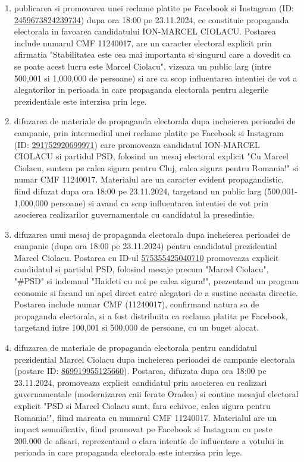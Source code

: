 \documentclass[a4paper,12pt]{article}
\begin{document}
\begin{enumerate}[leftmargin=*, label=\arabic*.)]
    \item publicarea si promovarea unei reclame platite pe Facebook si Instagram (ID: \href{https://www.facebook.com/ads/library/?id=2459673824239734}{2459673824239734}) dupa ora 18:00 pe 23.11.2024, ce constituie propaganda electorala in favoarea candidatului ION-MARCEL CIOLACU. Postarea include numarul CMF 11240017, are un caracter electoral explicit prin afirmatia "Stabilitatea este cea mai importanta si singurul care a dovedit ca se poate acest lucru este Marcel Ciolacu", vizeaza un public larg (intre 500,001 si 1,000,000 de persoane) si are ca scop influentarea intentiei de vot a alegatorilor in perioada in care propaganda electorala pentru alegerile prezidentiale este interzisa prin lege.
    \item difuzarea de materiale de propaganda electorala dupa incheierea perioadei de campanie, prin intermediul unei reclame platite pe Facebook si Instagram (ID: \href{https://www.facebook.com/ads/library/?id=291752920699971}{291752920699971}) care promoveaza candidatul ION-MARCEL CIOLACU si partidul PSD, folosind un mesaj electoral explicit "Cu Marcel Ciolacu, suntem pe calea sigura pentru Cluj, calea sigura pentru Romania!" si numar CMF 11240017. Materialul are un caracter evident propagandistic, fiind difuzat dupa ora 18:00 pe 23.11.2024, targetand un public larg (500,001-1,000,000 persoane) si avand ca scop influentarea intentiei de vot prin asocierea realizarilor guvernamentale cu candidatul la presedintie.
    \item difuzarea unui mesaj de propaganda electorala dupa incheierea perioadei de campanie (dupa ora 18:00 pe 23.11.2024) pentru candidatul prezidential Marcel Ciolacu. Postarea cu ID-ul \href{https://www.facebook.com/ads/library/?id=575355425040710}{575355425040710} promoveaza explicit candidatul si partidul PSD, folosind mesaje precum "Marcel Ciolacu", "\#PSD" si indemnul "Haideti cu noi pe calea sigura!", prezentand un program economic si facand un apel direct catre alegatori de a sustine aceasta directie. Postarea include numar CMF (11240017), confirmand natura sa de propaganda electorala, si a fost distribuita ca reclama platita pe Facebook, targetand intre 100,001 si 500,000 de persoane, cu un buget alocat.
    \item difuzarea de materiale de propaganda electorala pentru candidatul prezidential Marcel Ciolacu dupa incheierea perioadei de campanie electorala (postare ID: \href{https://www.facebook.com/ads/library/?id=869919955125660}{869919955125660}). Postarea, difuzata dupa ora 18:00 pe 23.11.2024, promoveaza explicit candidatul prin asocierea cu realizari guvernamentale (modernizarea caii ferate Oradea) si contine mesajul electoral explicit "PSD si Marcel Ciolacu sunt, fara echivoc, calea sigura pentru Romania!", fiind marcata cu numarul CMF 11240017. Materialul are un impact semnificativ, fiind promovat pe Facebook si Instagram cu peste 200.000 de afisari, reprezentand o clara intentie de influentare a votului in perioada in care propaganda electorala este interzisa prin lege.

\end{enumerate}
\end{document}
